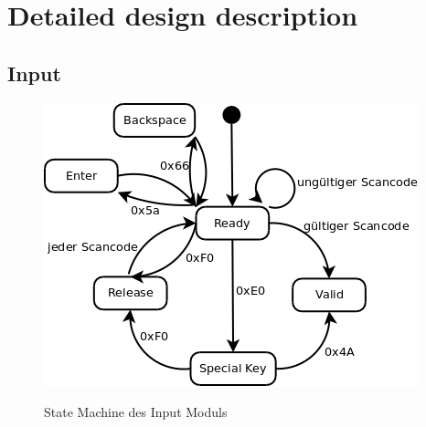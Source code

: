 \section{Detailed design description}



\subsection{Input}
\begin{figure}[!ht]
 \caption{State Machine des Input Moduls}
 \centering
 \includegraphics[scale=0.55]{pics/Input.png}
 \label{fig:Modules}
\end{figure}

